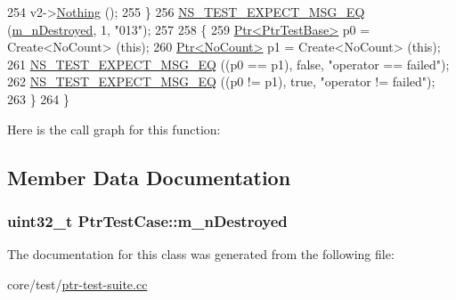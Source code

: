 \begin{DoxyCode}
254     v2->\hyperlink{classNoCount_a66f248c80d0a4048b5fcf344edb8c5c3}{Nothing} ();
255   \}
256   \hyperlink{group__testing_ga7304ba46a28d8cf08dfdfd6499cf7068}{NS\_TEST\_EXPECT\_MSG\_EQ} (\hyperlink{classPtrTestCase_a189fef4a0d0e348de7554be35da17977}{m\_nDestroyed}, 1, \textcolor{stringliteral}{"013"});
257 
258   \{
259     \hyperlink{classns3_1_1Ptr}{Ptr<PtrTestBase>} p0 = Create<NoCount> (\textcolor{keyword}{this});
260     \hyperlink{classns3_1_1Ptr}{Ptr<NoCount>} p1 = Create<NoCount> (\textcolor{keyword}{this});
261     \hyperlink{group__testing_ga7304ba46a28d8cf08dfdfd6499cf7068}{NS\_TEST\_EXPECT\_MSG\_EQ} ((p0 == p1), \textcolor{keyword}{false}, \textcolor{stringliteral}{"operator == failed"});
262     \hyperlink{group__testing_ga7304ba46a28d8cf08dfdfd6499cf7068}{NS\_TEST\_EXPECT\_MSG\_EQ} ((p0 != p1), \textcolor{keyword}{true}, \textcolor{stringliteral}{"operator != failed"});
263   \}
264 \}
\end{DoxyCode}


Here is the call graph for this function\+:




\subsection{Member Data Documentation}
\subsubsection[{\texorpdfstring{m\+\_\+n\+Destroyed}{m_nDestroyed}}]{\setlength{\rightskip}{0pt plus 5cm}uint32\+\_\+t Ptr\+Test\+Case\+::m\+\_\+n\+Destroyed\hspace{0.3cm}{\ttfamily [private]}}\hypertarget{classPtrTestCase_a189fef4a0d0e348de7554be35da17977}{}\label{classPtrTestCase_a189fef4a0d0e348de7554be35da17977}


The documentation for this class was generated from the following file\+:\begin{DoxyCompactItemize}
\item 
core/test/\hyperlink{ptr-test-suite_8cc}{ptr-\/test-\/suite.\+cc}\end{DoxyCompactItemize}
